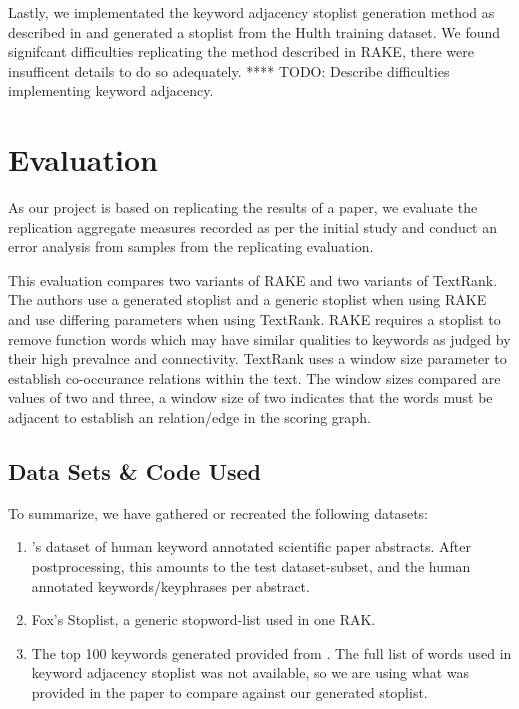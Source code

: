 \documentclass[11pt,a4paper]{article}
\begin{document}
Lastly, we implementated the keyword adjacency stoplist generation method as described in \citet{1} and generated a stoplist from the Hulth training dataset. We found signifcant difficulties replicating the method described in RAKE, there were insufficent details to do so adequately.  **** TODO: Describe difficulties implementing keyword adjacency. 

\section{Evaluation}

As our project is based on replicating the results of a paper, we evaluate the replication aggregate measures recorded as per the initial study and conduct an error analysis from samples from the replicating evaluation. 

This evaluation compares two variants of RAKE and two variants of TextRank. The authors use a generated stoplist and a generic stoplist when using RAKE and use differing parameters when using TextRank. RAKE requires a stoplist to remove function words which may have similar qualities to keywords as judged by their high prevalnce and connectivity. TextRank uses a window size parameter to establish co-occurance relations within the text. The window sizes compared are values of two and three, a window size of two indicates that the words must be adjacent to establish an relation/edge in the scoring graph. 

\subsection{Data Sets \& Code Used}
To summarize, we have gathered or recreated the following datasets:

\begin{enumerate}
\item \citet{hulth-2003-improved}'s dataset of human keyword annotated scientific paper abstracts. After postprocessing, this amounts to the test dataset-subset, and the human annotated keywords/keyphrases per abstract.
\item Fox's Stoplist, a generic stopword-list used in one RAK.
\item The top 100 keywords generated provided from . The full list of words used in  keyword adjacency stoplist was not available, so we are using what was provided in the paper to compare against our generated stoplist. 
\end{enumerate}  
\end{document}
